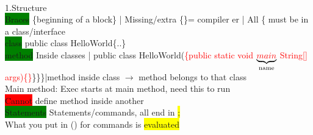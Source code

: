 ~\\
\color{Orange}
1.Structure
\\\colorbox{Green}{Braces} \{beginning of a block\} | Missing/extra \{\}= compiler er | All \{ must be in a class/interface
\\ \colorbox{Green}{class} public class HelloWorld\{..\}
\\ \colorbox{Green}{method} Inside classes | public class HelloWorld(\textcolor{Red}{\{public static void} $\underbrace{\textcolor{red}{main}}_{\text{name}}$ \textcolor{red}{String[] args)\{\}}\}\}\}|method inside class $\rightarrow$ method belongs to that class
\\Main method: Exec starts at main method, need this to run
\\ \colorbox{red}{Cannot} define method inside another
\\ \colorbox{Green}{Statements} Statements/commands, all end in \colorbox{yellow}{;}
\\ What you put in () for commands is \colorbox{Yellow}{evaluated} 

